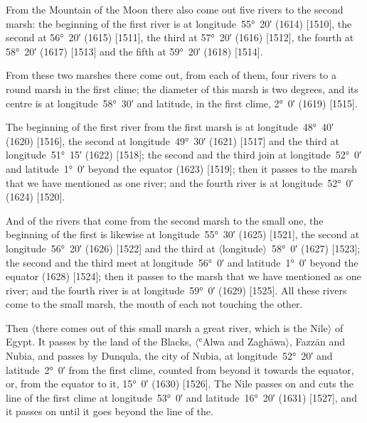 \documentclass[11pt]{article}
\newcommand{\Pg}[1]{\marginpar{\footnotesize #1}}
\newcommand{\Ang}[1]{\ensuremath{#1}}
\begin{document}
From the Mountain of the Moon there also come out five rivers to the second marsh: the beginning of the first river is at longitude~55°~20′ (1614) [1510], the second at 56°~20′ (1615) [1511], the third at 57°~20′ (1616) [1512], the fourth at 58°~20′ (1617) [1513]\Pg{p. 107} and the fifth at 59°~20′ (1618) [1514].

From these two marshes there come out, from each of them, four rivers to a round marsh in the first clime; the diameter of this marsh is two degrees, and its centre is at longitude~58°~30′ and latitude, in the first clime, 2°~0′ (1619) [1515].

The beginning of the first river from the first marsh is at longitude~48°~40′ (1620) [1516], the second at longitude~49°~30′ (1621) [1517] and the third at longitude~51°~15′ (1622) [1518]; the second and the third join at longitude~52°~0′ and latitude~1°~0′ beyond the equator (1623) [1519]; then it passes to the marsh that we have mentioned as one river; and the fourth river is at longitude~52°~0′ (1624) [1520].

And of the rivers that come from the second marsh to the small one, the beginning of the first is likewise at longitude~55°~30′ (1625) [1521], the second at longitude~56°~20′ (1626) [1522] and the third at \Ang{\langle}longitude\Ang{\rangle}~58°~0′ (1627) [1523]; the second and the third meet at longitude~56°~0′ and latitude~1°~0′ beyond the equator (1628) [1524]; then it passes to the marsh that we have mentioned as one river; and the fourth river is at longitude~59°~0′ (1629) [1525]. All these rivers come to the small marsh, the mouth of each not touching the other.

Then \Ang{\langle}there comes out of this small marsh a great river, which is the Nile\Ang{\rangle} of Egypt. It passes by the land of the Blacks, \Ang{\langle}ʿAlwa and Zaghāwa\Ang{\rangle}, Fazzān and Nubia, and passes by Dunqula, the city of Nubia, at longitude~52°~20′ and latitude~2°~0′ from the first clime, counted from beyond it towards the equator, or, from the equator to it, 15°~0′ (1630) [1526]\Pg{p. 108}. The Nile passes on and cuts the line of the first clime at longitude~53°~0′ and latitude~16°~20′ (1631) [1527], and it passes on until it goes beyond the line of the.
\end{document}
